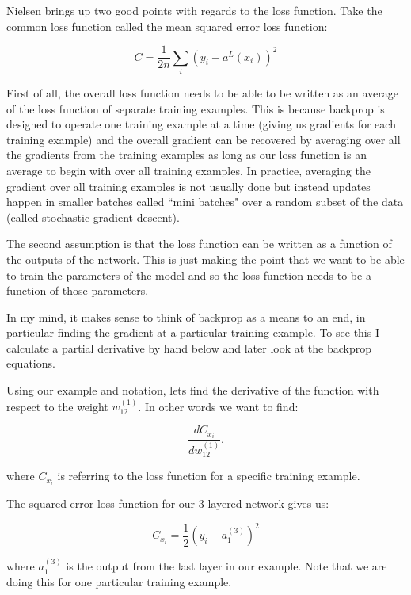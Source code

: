 Nielsen brings up two good points with regards to the loss function. Take the common loss function called the mean squared error loss function:

\begin{equation}
C = \frac{1}{2n} \sum_i (y_i - a^{L}(x_i))^2
\end{equation}

First of all, the overall loss function needs to be able to be written as an average of the loss function of separate training examples. This is because backprop is designed to operate one training example at a time (giving us gradients for each training example) and the overall gradient can be recovered by averaging over all the gradients from the training examples as long as our loss function is an average to begin with over all training examples. In practice, averaging the gradient over all training examples is not usually done but instead updates happen in smaller batches called ``mini batches" over a random subset of the data (called stochastic gradient descent).

The second assumption is that the loss function can be written as a function of the outputs of the network. This is just making the point that we want to be able to train the parameters of the model and so the loss function needs to be a function of those parameters.
 
In my mind, it makes sense to think of backprop as a means to an end, in particular finding the gradient at a particular training example. To see this I calculate a partial derivative by hand below and later look at the backprop equations.

 Using our example and notation, lets find the derivative of the function with respect to the weight $w^{(1)}_{12}$. In other words we want to find:
 
 \begin{equation}
\frac{dC_{x_i}}{dw^{(1)}_{12}}.
 \end{equation}
 
\noindent where $C_{x_i}$ is referring to the loss function for a specific training example.
 
\noindent The squared-error loss function for our 3 layered network gives us:
 
 \begin{equation}
 C_{x_i} = \frac{1}{2} {(y_i - a_1^{(3)})^2}
 \end{equation}
 
 \noindent where $a_1^{(3)}$ is the output from the last layer in our example. Note that we are doing this for one particular training example. 
 
